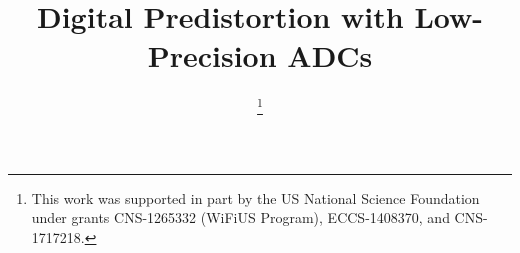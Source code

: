 \documentclass[conference]{IEEEtran}
\begin{document}
%
\title{Digital Predistortion with Low-Precision ADCs}



% 
\author{
	\thanks{ 
		This work was supported in part by the US National Science Foundation under grants CNS-1265332 (WiFiUS Program), ECCS-1408370, and CNS-1717218.}}




\maketitle
\end{document}
